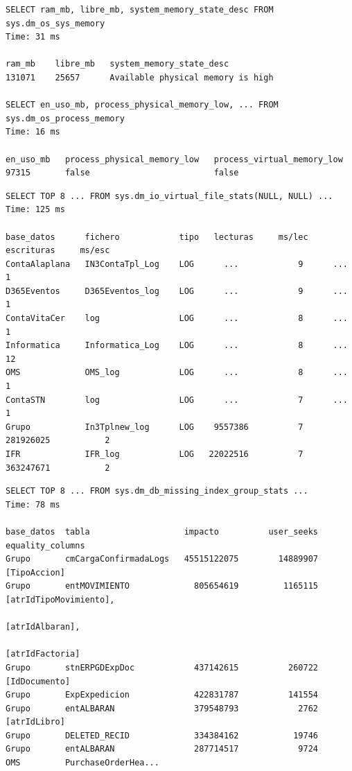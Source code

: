 \documentclass[11pt,a4paper]{article}
\begin{document}
\begin{lstlisting}[style=salida]
SELECT ram_mb, libre_mb, system_memory_state_desc FROM sys.dm_os_sys_memory
Time: 31 ms

ram_mb    libre_mb   system_memory_state_desc
131071    25657      Available physical memory is high

SELECT en_uso_mb, process_physical_memory_low, ... FROM sys.dm_os_process_memory
Time: 16 ms

en_uso_mb   process_physical_memory_low   process_virtual_memory_low
97315       false                         false
\end{lstlisting}

\begin{lstlisting}[style=salida]
SELECT TOP 8 ... FROM sys.dm_io_virtual_file_stats(NULL, NULL) ...
Time: 125 ms

base_datos      fichero            tipo   lecturas     ms/lec   escrituras     ms/esc
ContaAlaplana   IN3ContaTpl_Log    LOG      ...            9      ...              1
D365Eventos     D365Eventos_log    LOG      ...            9      ...              1
ContaVitaCer    log                LOG      ...            8      ...              1
Informatica     Informatica_Log    LOG      ...            8      ...             12
OMS             OMS_log            LOG      ...            8      ...              1
ContaSTN        log                LOG      ...            7      ...              1
Grupo           In3Tplnew_log      LOG    9557386          7   281926025           2
IFR             IFR_log            LOG   22022516          7   363247671           2
\end{lstlisting}

\begin{lstlisting}[style=salida]
SELECT TOP 8 ... FROM sys.dm_db_missing_index_group_stats ...
Time: 78 ms

base_datos  tabla                   impacto          user_seeks   equality_columns
Grupo       cmCargaConfirmadaLogs   45515122075        14889907   [TipoAccion]
Grupo       entMOVIMIENTO             805654619         1165115   [atrIdTipoMovimiento],
                                                                  [atrIdAlbaran],
                                                                  [atrIdFactoria]
Grupo       stnERPGDExpDoc            437142615          260722   [IdDocumento]
Grupo       ExpExpedicion             422831787          141554
Grupo       entALBARAN                379548793            2762   [atrIdLibro]
Grupo       DELETED_RECID             334384162           19746
Grupo       entALBARAN                287714517            9724
OMS         PurchaseOrderHea...
\end{lstlisting}
\end{document}
